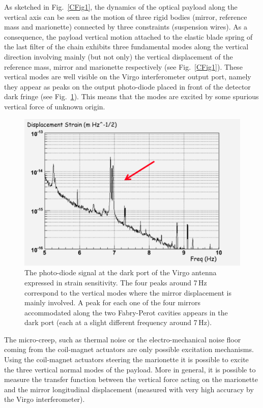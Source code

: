 As sketched in Fig.~\ref{CFig1}, the dynamics of the optical payload along the vertical axis can be seen as the motion of three rigid bodies (mirror, reference mass and marionette) connected by three constraints (suspension wires). As a consequence, the payload vertical motion attached to the elastic blade spring of the last filter of the chain exhibits three fundamental modes along the vertical direction involving mainly (but not only) the vertical displacement of the reference mass, mirror and marionette respectively (see Fig.~\ref{CFig1}).
These vertical modes are well visible on the Virgo interferometer output port, namely they appear as peaks on the output photo-diode placed in front of the detector dark fringe (see Fig.~\ref{CFig2}). This means that the modes are excited by some spurious vertical force of unknown origin. 
\begin{figure}[t]
	\begin{center}
		\includegraphics[width=13cm]{./Sec_Suspensions/Figures/Creep-Fig2.pdf}
			\caption{The photo-diode signal at the dark port of the Virgo antenna expressed in strain sensitivity. The four peaks around 7\,Hz correspond to the vertical modes where the mirror displacement is mainly involved. A peak for each one of the four mirrors accommodated along the two Fabry-Perot cavities appears in the dark port (each at a slight different frequency around 7\,Hz).}
\label{CFig2}
	\end{center}
\end{figure}
The micro-creep, such as thermal noise or the electro-mechanical noise floor coming from the coil-magnet actuators are only possible excitation mechanisms. Using the coil-magnet actuators steering the marionette it is possible to excite the three vertical normal modes of the payload. More in general, it is possible to measure the transfer function between the vertical force acting on the marionette and the mirror longitudinal displacement (measured with very high accuracy by the Virgo interferometer). 
